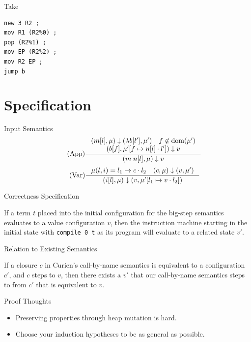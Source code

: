 \documentclass[14pt,mathserif]{beamer}
\begin{document}
\begin{frame}[fragile]{Take}
\begin{lstlisting}
new 3 R2 ;
mov R1 (R2%0) ;
pop (R2%1) ;
mov EP (R2%2) ;
mov R2 EP ;
jump b
\end{lstlisting}
\end{frame}

\section{Specification}
\begin{frame}{Input Semantics}
\begin{align*}
\tag{App} \inference
{(m[l], \mu) \downarrow (\lambda b[l'], \mu') \quad f \not \in \textnormal{dom}(\mu') \\ 
(b[f], \mu'[f \mapsto n[l] \cdot l']) \downarrow v}
{(m \; n[l], \mu) \downarrow v}  
\end{align*}
\begin{align*}
\tag{Var} \inference
{\mu(l, i) = l_1 \mapsto c \cdot l_2 \quad (c, \mu) \downarrow (v, \mu')}
{(i[l],\mu) \downarrow (v, \mu'[l_1 \mapsto v \cdot l_2])}
\end{align*}
\end{frame}

\begin{frame}{Correctness Specification}
\begin{theorem} 
If a term $t$ placed into the initial configuration for the big-step semantics
evaluates to a value configuration $v$, then the instruction machine starting
in the initial state with \texttt{compile 0 t} as its program will evaluate to a
related state $v'$.  
\end{theorem}
\end{frame}

\begin{frame}{Relation to Existing Semantics}
\begin{theorem}
If a closure $c$ in Curien's call-by-name semantics is equivalent to a
configuration $c'$, and $c$ steps to $v$, then there exists a $v'$ that our
call-by-name semantics steps to from $c'$ that is equivalent to $v$.
\end{theorem}
\end{frame}

\begin{frame}{Proof Thoughts}
\begin{itemize}
\item Preserving properties through heap mutation is hard.
\item Choose your induction hypotheses to be as general as possible.
\end{itemize}
\end{frame}
\end{document}
